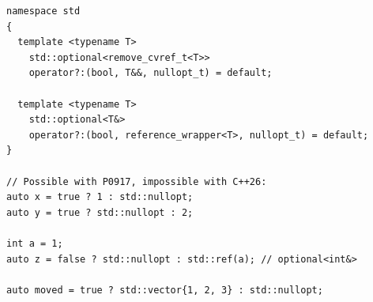 \medskip\begin{lstlisting}[style=Vc]
namespace std
{
  template <typename T>
    std::optional<remove_cvref_t<T>>
    operator?:(bool, T&&, nullopt_t) = default;

  template <typename T>
    std::optional<T&>
    operator?:(bool, reference_wrapper<T>, nullopt_t) = default;
}

// Possible with P0917, impossible with C++26:
auto x = true ? 1 : std::nullopt;
auto y = true ? std::nullopt : 2;

int a = 1;
auto z = false ? std::nullopt : std::ref(a); // optional<int&>

auto moved = true ? std::vector{1, 2, 3} : std::nullopt;
\end{lstlisting}


